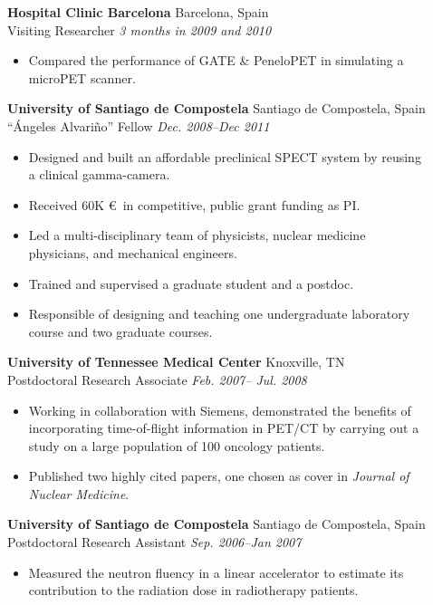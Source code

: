 \documentclass[letterpaper]{article}
\begin{document}
\begin{description}
\item[]
    \textbf{Hospital Clinic Barcelona} \hfill Barcelona, Spain \\
Visiting Researcher \hfill  \textit{3 months in 2009 and 2010} 
\begin{itemize}
\item Compared the performance of GATE \& PeneloPET in simulating a microPET
scanner.
\end{itemize}

\item[] \textbf{University of Santiago de Compostela} \hfill Santiago de Compostela, Spain\\
    ``\'Angeles Alvari\~no'' Fellow \hfill \textit{Dec. 2008--Dec 2011}
    \vspace*{-0.2cm}
   \begin{itemize} 
   \item Designed and built an affordable preclinical SPECT system by reusing a clinical gamma-camera. 
    \item Received 60K \euro~in competitive, public grant funding as PI. 
    \item Led a multi-disciplinary team of physicists, nuclear medicine physicians, and mechanical engineers.
    \item Trained and supervised a graduate student and a postdoc. 
    \item Responsible of designing and teaching one undergraduate laboratory course and two graduate courses.  
   \end{itemize} 

\item[] \textbf{University of Tennessee Medical Center} \hfill Knoxville, TN \\
Postdoctoral Research Associate \hfill \textit{Feb. 2007-- Jul. 2008} 
 \vspace*{-0.2cm}
 \begin{itemize} 
 \item Working in collaboration with Siemens, demonstrated the benefits of incorporating time-of-flight information in PET/CT by carrying out a study on a large population of 100 oncology patients. 
\item Published two highly cited papers, one chosen as cover in \textit{Journal of Nuclear Medicine}.
 \end{itemize} 
 
\item[] \textbf{University of Santiago de Compostela} \hfill Santiago de Compostela, Spain\\
    Postdoctoral Research Assistant \hfill \textit{Sep. 2006--Jan 2007}
\vspace*{-0.2cm}
\begin{itemize}
  \item  Measured the neutron fluency in a linear accelerator to estimate its
    contribution to the radiation dose in radiotherapy patients.
 \end{itemize} 


\end{description}
\end{document}
